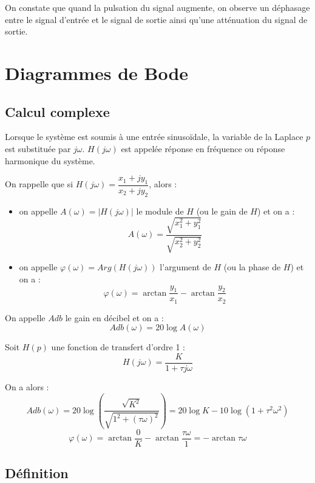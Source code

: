 \documentclass[10pt,oneside]{article}
\begin{document}
On constate que quand la pulsation du signal augmente, on observe un déphasage entre le signal d'entrée et le signal de sortie ainsi qu'une atténuation du signal de sortie. 

\section{Diagrammes de Bode}

\subsection{Calcul complexe}
Lorsque le système est soumis à une entrée sinusoïdale, la variable de la Laplace $p$ est substituée par $j\omega$. $H(j\omega)$ est appelée réponse en fréquence ou réponse harmonique du système.

\begin{resultat}
On rappelle que si $H(j\omega) = \dfrac{x_1+jy_1}{x_2+jy_2}$, alors : 
\begin{itemize}
\item on appelle $A(\omega)=|H(j\omega)|$ le module de $H$ (ou le gain de $H$) et on a : 
$$
A(\omega)= \dfrac{\sqrt{x_1^2+y_1^2}}{\sqrt{x_2^2+y_2^2}}
$$
\item on appelle $\varphi(\omega)=Arg(H(j\omega))$ l'argument de $H$ (ou la phase de $H$) et on a : 
$$
\varphi(\omega)= \arctan \dfrac{y_1}{x_1}-\arctan \dfrac{y_2}{x_2}
$$
\end{itemize}
\end{resultat}

\begin{rem}
On appelle $Adb$ le gain en décibel et on a :
$$
Adb(\omega)=20 \log A(\omega)
$$
\end{rem}

\begin{exemple}
Soit $H(p)$ une fonction de transfert d'ordre 1 :
$$
H(j\omega)= \dfrac{K}{1+\tau j\omega }
$$

On a alors : 
$$
Adb(\omega) = 20 \log \left(\dfrac{\sqrt{K^2}}{\sqrt{1^2+(\tau\omega)^2}}\right) = 20 \log K - 10 \log \left(1+\tau^2\omega^2 \right)
$$
$$
\varphi(\omega)= \arctan \dfrac{0}{K}-\arctan \dfrac{\tau\omega}{1} = - \arctan \tau\omega
$$

\end{exemple}

\subsection{Définition}
\end{document}
